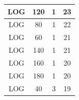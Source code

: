 \documentclass{pracamgr}
\begin{document}
\begin{appendices}
\begin{center}
\begin{tabular}{| c | c | c | c |}
        LOG & 120 & 1 & 23 \\ \hline
        LOG & 80 & 1 & 22 \\ \hline
        LOG & 60 & 1 & 21 \\ \hline
        LOG & 140 & 1 & 21 \\ \hline
        LOG & 160 & 1 & 20 \\ \hline
        LOG & 180 & 1 & 20 \\ \hline
        LOG & 40 & 3 & 19 \\ \hline
    \end{tabular}
\end{center}

\end{appendices}
\end{document}
